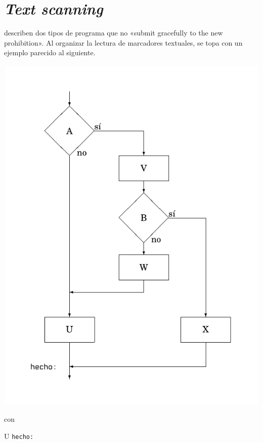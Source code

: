 \chapter{\emph{Text scanning}}


\citet{1972_Knuth} describen dos tipos de programa que no
«submit gracefully to the new prohibition». Al organizar la
lectura de marcadores textuales, \citet[p. 271]{1974_Knuth}
se topa con un ejemplo parecido al siguiente.

\begin{minipage}{.6\linewidth}
\begin{center}
\includegraphics[scale=.8]{diagrama}
\end{center}
\end{minipage}
\hfill
\begin{minipage}{.3\linewidth}
\begin{center}
\NoCaptionOfAlgo
\begin{algorithm}[H]
\caption{con}
\DontPrintSemicolon
{}
U\;
\texttt{hecho:}
\end{algorithm}
\end{center}
\end{minipage}

